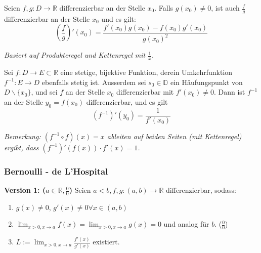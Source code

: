 Seien $f,g : D \rightarrow \mathbb{R}$ differenzierbar an der Stelle $x_0$. Falls $g(x_0) \neq 0$, ist auch $\frac{f}{g}$ differenzierbar an der Stelle $x_0$ und es gilt:
$$(\frac{f}{g})'(x_0) = \frac{f'(x_0)g(x_0)-f(x_0)g'(x_0)}{g(x_0)^2}$$

\textit{Basiert auf Produkteregel und Kettenregel mit $\frac{1}{x}$.}

Sei $f: D \rightarrow E \subset \mathbb{R}$ eine stetige, bijektive Funktion, derein Umkehrfunktion $f^{-1} : E \rightarrow D$ ebenfalls stetig ist. Ausserdem sei $s_0 \in \mathbb{D}$ ein Häufungspunkt von $D \backslash \{x_0\}$, und sei $f$ an der Stelle $x_0$ differenzierbar mit $f'(x_0) \neq 0$.
Dann ist $f^{-1}$ an der Stelle $y_0=f(x_0)$ differenzierbar, und es gilt
$$(f^{-1})'(y_0)=\frac{1}{f'(x_0)}$$

\textit{Bemerkung: $(f^{-1}\circ f)(x)=x$ ableiten auf beiden Seiten (mit Kettenregel) ergibt, dass $(f^{-1})'(f(x))\cdot f'(x)=1$.}


\subsubsection{Bernoulli - de L'Hospital}

\textbf{Version 1: ($a \in \mathbb{R}, \frac{0}{0}$)}
Seien $a<b, f,g:(a,b) \rightarrow \mathbb{R}$ differenzierbar, sodass:
\begin{enumerate}
    \item $g(x) \neq 0$, $g'(x) \neq 0 \forall x\in (a,b)$
    \item $\lim_{x>0, x \rightarrow a} f(x)= \lim_{x>0, x \rightarrow a} g(x)=0$ und analog für $b$. ($\frac{0}{0}$)
    \item $L:= \lim_{x>0, x \rightarrow a} \frac{f'(x)}{g'(x)}$ existiert.
\end{enumerate}

